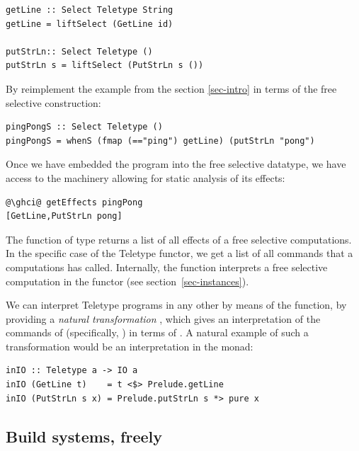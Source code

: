 \begin{verbatim}
getLine :: Select Teletype String
getLine = liftSelect (GetLine id)

putStrLn:: Select Teletype ()
putStrLn s = liftSelect (PutStrLn s ())
\end{verbatim}

By reimplement the  example from the section \ref{sec-intro}
in terms of the free selective construction:

\begin{verbatim}
pingPongS :: Select Teletype ()
pingPongS = whenS (fmap (=="ping") getLine) (putStrLn "pong")
\end{verbatim}

Once we have embedded the  program into the free selective datatype,
we have access to the machinery allowing for static analysis of its effects:

\begin{verbatim}
@\ghci@ getEffects pingPong
[GetLine,PutStrLn pong]
\end{verbatim}

The  function of type 
returns a list of all effects of a free selective computations. In the specific case of
the Teletype functor, we get a list of all commands that a computations has called.
Internally, the  function interprets a free selective computation
in the  functor (see section~\ref{sec-instances}).

We can interpret Teletype programs in any other  by means of the
 function, by providing a \emph{natural transformation} , which gives an interpretation of the commands of
 (specifically, ) in terms of . A natural example of such a
transformation would be an interpretation in the  monad:

\begin{verbatim}
inIO :: Teletype a -> IO a
inIO (GetLine t)    = t <$> Prelude.getLine
inIO (PutStrLn s x) = Prelude.putStrLn s *> pure x
\end{verbatim}

\subsection{Build systems, freely}\label{sec-free-build}


